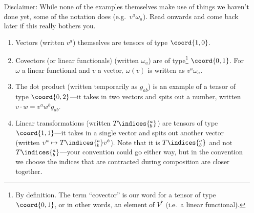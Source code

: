 \begin{exm}{}{}
Disclaimer:  While none of the examples themselves make use of things we haven't done yet, some of the notation does (e.g.~$v^a\omega _a$).  Read onwards and come back later if this really bothers you.
\begin{enumerate}
\item Vectors (written $v^a$) themselves are tensors of type $\coord{1,0}$.
\item Covectors (or linear functionals) (written $\omega _a$) are of type\footnote{By definition.  The term ``covector'' is our word for a tensor of type $\coord{0,1}$, or in other words, an element of $V^{\dagger}$ (i.e.~a linear functional).} $\coord{0,1}$.  For $\omega$ a linear functional and $v$ a vector, $\omega (v)$ is written as $v^a\omega _a$.
\item The dot product (written temporarily as $g_{ab}$) is an example of a tensor of type $\coord{0,2}$---it takes in two vectors and spits out a number, written $v\cdot w=v^aw^bg_{ab}$.
\item Linear transformations (written $T\indices{^a_b}$) are tensors of type $\coord{1,1}$---it takes in a single vector and spits out another vector (written $v^a\mapsto T\indices{^a_b}v^b$).  Note that it is $T\indices{^a_b}$ and not $T\indices{_b^a}$---your convention could go either way, but in the convention we choose the indices that are contracted during composition are closer together.
\end{enumerate}
\end{exm}

